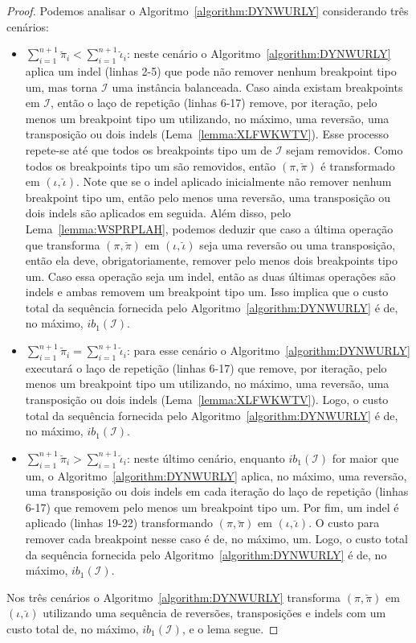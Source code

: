 \begin{proof}
  Podemos analisar o Algoritmo~\ref{algorithm:DYNWURLY} considerando três cenários:
  \begin{itemize}
    \item $\sum_{i=1}^{n+1}\breve\pi_i < \sum_{i=1}^{n+1}\breve\iota_i$: neste cenário o Algoritmo~\ref{algorithm:DYNWURLY} aplica um indel (linhas 2-5) que pode não remover nenhum breakpoint tipo um, mas torna $\mathcal{I}$ uma instância balanceada. Caso ainda existam breakpoints em $\mathcal{I}$, então o laço de repetição (linhas 6-17) remove, por iteração, pelo menos um breakpoint tipo um utilizando, no máximo, uma reversão, uma transposição ou dois indels (Lema~\ref{lemma:XLFWKWTV}). Esse processo repete-se até que todos os breakpoints tipo um de $\mathcal{I}$ sejam removidos. Como todos os breakpoints tipo um são removidos, então $(\pi,\breve\pi)$ é transformado em $(\iota,\breve\iota)$. Note que se o indel aplicado inicialmente não remover nenhum breakpoint tipo um, então pelo menos uma reversão, uma transposição ou dois indels são aplicados em seguida. Além disso, pelo Lema~\ref{lemma:WSPRPLAH}, podemos deduzir que caso a última operação que transforma $(\pi,\breve\pi)$ em $(\iota,\breve\iota)$ seja uma reversão ou uma transposição, então ela deve, obrigatoriamente, remover pelo menos dois breakpoints tipo um. Caso essa operação seja um indel, então as duas últimas operações são indels e ambas removem um breakpoint tipo um. Isso implica que o custo total da sequência fornecida pelo Algoritmo~\ref{algorithm:DYNWURLY} é de, no máximo, $ib_1(\mathcal{I})$.
    \item $\sum_{i=1}^{n+1}\breve\pi_i = \sum_{i=1}^{n+1}\breve\iota_i$: para esse cenário o Algoritmo~\ref{algorithm:DYNWURLY} executará o laço de repetição (linhas 6-17) que remove, por iteração, pelo menos um breakpoint tipo um utilizando, no máximo, uma reversão, uma transposição ou dois indels (Lema~\ref{lemma:XLFWKWTV}). Logo, o custo total da sequência fornecida pelo Algoritmo~\ref{algorithm:DYNWURLY} é de, no máximo, $ib_1(\mathcal{I})$.
    \item $\sum_{i=1}^{n+1}\breve\pi_i > \sum_{i=1}^{n+1}\breve\iota_i$: neste último cenário, enquanto $ib_1(\mathcal{I})$ for maior que um, o Algoritmo~\ref{algorithm:DYNWURLY} aplica, no máximo, uma reversão, uma transposição ou dois indels em cada iteração do laço de repetição (linhas 6-17) que removem pelo menos um breakpoint tipo um. Por fim, um indel é aplicado (linhas 19-22) transformando $(\pi,\breve\pi)$ em $(\iota,\breve\iota)$. O custo para remover cada breakpoint nesse caso é de, no máximo, um. Logo, o custo total da sequência fornecida pelo Algoritmo~\ref{algorithm:DYNWURLY} é de, no máximo, $ib_1(\mathcal{I})$. 
  \end{itemize}
  Nos três cenários o Algoritmo~\ref{algorithm:DYNWURLY} transforma $(\pi,\breve\pi)$ em $(\iota,\breve\iota)$ utilizando uma sequência de reversões, transposições e indels com um custo total de, no máximo, $ib_1(\mathcal{I})$, e o lema segue.
\end{proof}

